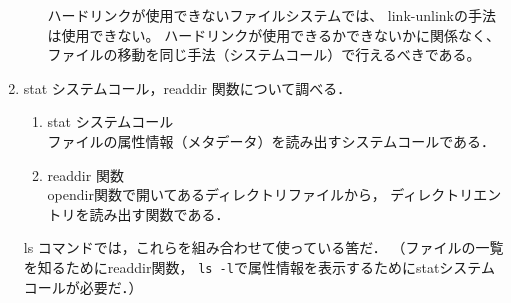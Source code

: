 \documentclass[a4j,twcolumn,11pt,nomag]{ltjarticle}      %
\begin{document}
\begin{enumerate}
\begin{enumerate}
ハードリンクが使用できないファイルシステムでは、
link-unlinkの手法は使用できない。
ハードリンクが使用できるかできないかに関係なく、
ファイルの移動を同じ手法（システムコール）で行えるべきである。
\end{enumerate}

\item stat システムコール，readdir 関数について調べる．
\begin{enumerate}
\item stat システムコール\\
ファイルの属性情報（メタデータ）を読み出すシステムコールである．
\item readdir 関数\\
opendir関数で開いてあるディレクトリファイルから，
ディレクトリエントリを読み出す関数である．
\end{enumerate}

ls コマンドでは，これらを組み合わせて使っている筈だ．
（ファイルの一覧を知るためにreaddir関数，
\texttt{ls -l}で属性情報を表示するためにstatシステムコールが必要だ．）
\end{enumerate}
\end{document}
